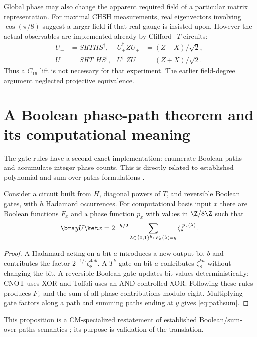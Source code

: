 Global phase may also change the apparent required field of a particular matrix representation. For maximal CHSH measurements, real eigenvectors involving $\cos(\pi/8)$ suggest a larger field if that real gauge is insisted upon. However the actual observables are implemented already by Clifford+$T$ circuits:
\begin{align}
 U_+&=SHTHS^\dagger,& U_+^\dagger ZU_+&=(Z-X)/\sqrt2,\\
 U_-&=SHT^\dagger HS^\dagger,& U_-^\dagger ZU_-&=(Z+X)/\sqrt2.
\end{align}
Thus a $C_{16}$ lift is not necessary for that experiment. The earlier field-degree argument neglected projective equivalence.

\section{A Boolean phase-path theorem and its computational meaning}\label{sec:paths}
The gate rules have a second exact implementation: enumerate Boolean paths and accumulate integer phase counts. This is directly related to established polynomial and sum-over-paths formulations \cite{dawson,amy2019,amy2023}.

\begin{proposition}\label{thm:paths}
Consider a circuit built from $H$, diagonal powers of $T$, and reversible Boolean gates, with $h$ Hadamard occurrences. For computational basis input $x$ there are Boolean functions $F_x$ and a phase function $p_x$ with values in $\Z/8\Z$ such that
\begin{equation}\label{eq:pathsum}
 \bra yU\ket x=2^{-h/2}
 \sum_{\lambda\in\{0,1\}^h:\,F_x(\lambda)=y}
 \zeta_8^{\,p_x(\lambda)}.
\end{equation}
\end{proposition}
\begin{proof}
A Hadamard acting on a bit $a$ introduces a new output bit $b$ and contributes the factor $2^{-1/2}\zeta_8^{4ab}$. A $T^k$ gate on bit $a$ contributes $\zeta_8^{ka}$ without changing the bit. A reversible Boolean gate updates bit values deterministically; CNOT uses XOR and Toffoli uses an AND-controlled XOR. Following these rules produces $F_x$ and the sum of all phase contributions modulo eight. Multiplying gate factors along a path and summing paths ending at $y$ gives \cref{eq:pathsum}.
\end{proof}
This proposition is a CM-specialized restatement of established Boolean/sum-over-paths semantics \cite{dawson,amy2019,amy2023}; its purpose is validation of the translation.

